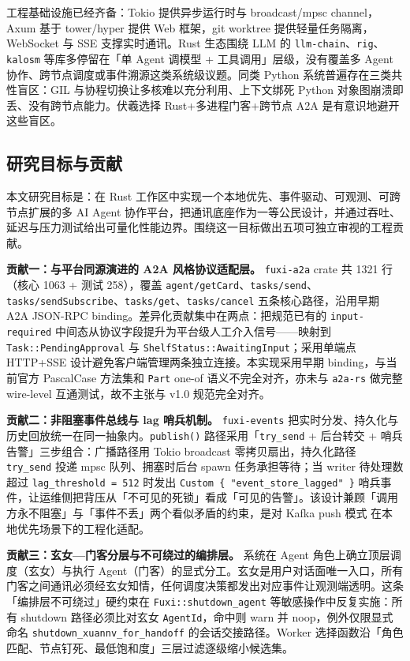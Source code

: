 工程基础设施已经齐备：Tokio 提供异步运行时与 broadcast/mpsc channel\parencite{tokio2024broadcast}，Axum 基于 tower/hyper 提供 Web 框架\parencite{axum2024docs}，git worktree 提供轻量任务隔离\parencite{git2024worktree}，WebSocket\parencite{fette2011websocket} 与 SSE\parencite{whatwg2024sse} 支撑实时通讯。Rust 生态围绕 LLM 的 \texttt{llm-chain}、\texttt{rig}、\texttt{kalosm} 等库多停留在「单 Agent 调模型 + 工具调用」层级，没有覆盖多 Agent 协作、跨节点调度或事件溯源这类系统级议题。同类 Python 系统普遍存在三类共性盲区：GIL 与协程切换让多核难以充分利用、上下文绑死 Python 对象图崩溃即丢、没有跨节点能力。伏羲选择 Rust+多进程门客+跨节点 A2A 是有意识地避开这些盲区。

\subsection{研究目标与贡献}

本文研究目标是：在 Rust 工作区中实现一个本地优先、事件驱动、可观测、可跨节点扩展的多 AI Agent 协作平台，把通讯底座作为一等公民设计，并通过吞吐、延迟与压力测试给出可量化性能边界。围绕这一目标做出五项可独立审视的工程贡献。

\textbf{贡献一：与平台同源演进的 A2A 风格协议适配层。} \texttt{fuxi-a2a} crate 共 1321 行（核心 1063 + 测试 258），覆盖 \texttt{agent/getCard}、\texttt{tasks/send}、\texttt{tasks/sendSubscribe}、\texttt{tasks/get}、\texttt{tasks/cancel} 五条核心路径，沿用早期 A2A JSON-RPC binding。差异化贡献集中在两点：把规范已有的 \texttt{input-required} 中间态从协议字段提升为平台级人工介入信号——映射到 \texttt{Task::PendingApproval} 与 \texttt{ShelfStatus::AwaitingInput}；采用单端点 HTTP+SSE 设计避免客户端管理两条独立连接。本实现采用早期 binding，与当前官方 PascalCase 方法集和 \texttt{Part} one-of 语义不完全对齐，亦未与 \texttt{a2a-rs} 做完整 wire-level 互通测试，故不主张与 v1.0 规范完全对齐。

\textbf{贡献二：非阻塞事件总线与 lag 哨兵机制。} \texttt{fuxi-events} 把实时分发、持久化与历史回放统一在同一抽象内。\texttt{publish()} 路径采用「\texttt{try\_send} + 后台转交 + 哨兵告警」三步组合：广播路径用 Tokio broadcast 零拷贝扇出，持久化路径 \texttt{try\_send} 投递 mpsc 队列、拥塞时后台 spawn 任务承担等待；当 writer 待处理数超过 \texttt{lag\_threshold = 512} 时发出 \texttt{Custom \{ "event\_store\_lagged" \}} 哨兵事件，让运维侧把背压从「不可见的死锁」看成「可见的告警」。该设计兼顾「调用方永不阻塞」与「事件不丢」两个看似矛盾的约束，是对 Kafka push 模式\parencite{kreps2011kafka} 在本地优先场景下的工程化适配。

\textbf{贡献三：玄女—门客分层与不可绕过的编排层。} 系统在 Agent 角色上确立顶层调度（玄女）与执行 Agent（门客）的显式分工。玄女是用户对话面唯一入口，所有门客之间通讯必须经玄女知情，任何调度决策都发出对应事件让观测端透明。这条「编排层不可绕过」硬约束在 \texttt{Fuxi::shutdown\_agent} 等敏感操作中反复实施：所有 shutdown 路径必须比对玄女 \texttt{AgentId}，命中则 warn 并 noop，例外仅限显式命名 \texttt{shutdown\_xuannv\_for\_handoff} 的会话交接路径。Worker 选择函数沿「角色匹配、节点钉死、最低饱和度」三层过滤逐级缩小候选集。

